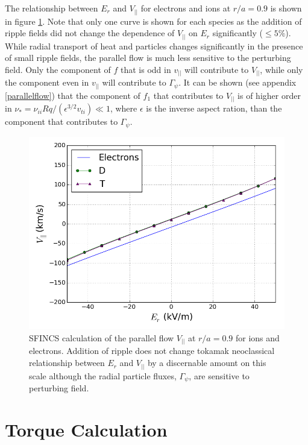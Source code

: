 \documentclass{article}
\begin{document}
The relationship between $E_r$ and $V_{||}$ for electrons and ions at $r/a = 0.9$ is shown in figure \ref{fig:Er_flow}. Note that only one curve is shown for each species as the addition of ripple fields did not change the dependence of $V_{||}$ on $E_r$ significantly ($\leq 5 \%$). While radial transport of heat and particles changes significantly in the presence of small ripple fields, the parallel flow is much less sensitive to the perturbing field. Only the component of $f$ that is odd in $v_{||}$ will contribute to $V_{||}$, while only the component even in $v_{||}$ will contribute to $\Gamma_{\psi}$. It can be shown (see appendix \ref{parallelflow}) that the component of $f_1$ that contributes to $V_{||}$ is of higher order in $\nu_* = \nu_{ii} Rq/(\epsilon^{3/2} v_{ti}) \ll 1 $, where $\epsilon$ is the inverse aspect ration, than the component that contributes to $\Gamma_{\psi}$. 

\begin{figure}[h!]
\centering
\includegraphics[width=.7\textwidth]{Er_flow.png}
\caption{\label{fig:Er_flow} SFINCS calculation of the parallel flow $V_{||}$ at $r/a = 0.9$ for ions and electrons. Addition of ripple does not change tokamak neoclassical relationship between $E_r$ and $V_{||}$ by a discernable amount on this scale although the radial particle fluxes, $\Gamma_{\psi}$, are sensitive to perturbing field.}
\end{figure}

\FloatBarrier

\section{Torque Calculation}\label{torque}
\end{document}
